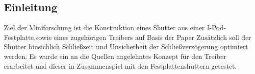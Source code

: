 \subsection{Einleitung}
Ziel der Miniforschung ist die Konstruktion eines Shutter aus einer I-Pod-Festplatte,sowie eines zugehörigen Treibers auf Basis der Paper %
Zusätzlich soll der Shutter hinsichlich Schließzeit und Unsicherheit der Schließverzögerung optimiert werden. Es wurde ein an die Quellen angelehntes Konzept für den Treiber erarbeitet und dieser in Zusammenspiel mit den Festplattenshuttern getestet.
